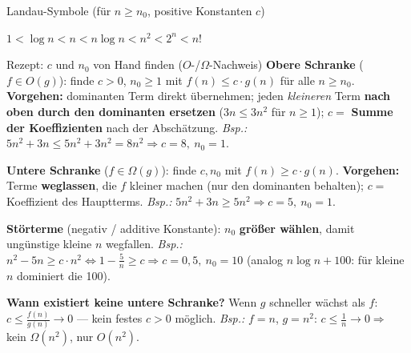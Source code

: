 \documentclass[10pt,a4paper]{article}
\begin{document}
\begin{defbox}{Landau-Symbole (für $n \ge n_0$, positive Konstanten $c$)}
\begin{minipage}[c]{0.37\linewidth}
\par{\scriptsize $1<\log n<n<n\log n<n^2<2^n<n!$}
\par\vspace{4pt}
\end{minipage}
\end{defbox}

\begin{defbox}{Rezept: $c$ und $n_0$ von Hand finden ($O$-/$\Omega$-Nachweis)}
\small
\textbf{Obere Schranke} ($f \in O(g)$): finde $c > 0$, $n_0 \ge 1$ mit
$f(n) \le c \cdot g(n)$ für alle $n \ge n_0$. \textbf{Vorgehen:} dominanten Term direkt
übernehmen; jeden \emph{kleineren} Term \textbf{nach oben durch den dominanten ersetzen}
($3n \le 3n^2$ für $n \ge 1$); $c =$ \textbf{Summe der Koeffizienten} nach der Abschätzung.
\emph{Bsp.:} $5n^2 + 3n \le 5n^2 + 3n^2 = 8n^2 \Rightarrow c = 8,\ n_0 = 1$.\par
\textbf{Untere Schranke} ($f \in \Omega(g)$): finde $c, n_0$ mit $f(n) \ge c \cdot g(n)$.
\textbf{Vorgehen:} Terme \textbf{weglassen}, die $f$ kleiner machen (nur den dominanten
behalten); $c =$ Koeffizient des Hauptterms.
\emph{Bsp.:} $5n^2 + 3n \ge 5n^2 \Rightarrow c = 5,\ n_0 = 1$.\par
\textbf{Störterme} (negativ / additive Konstante): $n_0$ \textbf{größer wählen}, damit
ungünstige kleine $n$ wegfallen. \emph{Bsp.:} $n^2 - 5n \ge c \cdot n^2 \Leftrightarrow
1 - \tfrac{5}{n} \ge c \Rightarrow c = 0{,}5,\ n_0 = 10$
(analog $n\log n + 100$: für kleine $n$ dominiert die 100).\par
\textbf{Wann existiert keine untere Schranke?} Wenn $g$ schneller wächst als $f$:
$c \le \tfrac{f(n)}{g(n)} \to 0$ — kein festes $c > 0$ möglich.
\emph{Bsp.:} $f = n$, $g = n^2$: $c \le \tfrac{1}{n} \to 0 \Rightarrow$ kein $\Omega(n^2)$,
nur $O(n^2)$.
\end{defbox}
\end{document}
